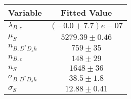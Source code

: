 \begin{tabular}[t]{lc}
\hline
Variable &Fitted Value\\
\hline\hline
$\lambda_{B,c}$&$(-0.0\pm7.7)e-07$\\
\hline
$\mu_S$&$5279.39\pm0.46$\\
\hline
$n_{B, D^* D_s h}$&$759\pm35$\\
\hline
$n_{B,c}$&$148\pm29$\\
\hline
$n_S$&$1648\pm36$\\
\hline
$\sigma_{B, D^* D_s h}$&$38.5\pm1.8$\\
\hline
$\sigma_S$&$12.88\pm0.41$\\
\hline
\end{tabular}